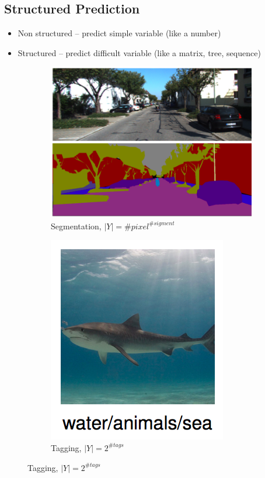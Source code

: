 \documentclass{beamer}
\begin{document}
\subsection*{Structured Prediction}
\begin{frame}
	\begin{itemize}
		\item Non structured -- predict simple variable (like a number)
		\item Structured -- predict difficult variable (like a matrix, tree, sequence)
	\end{itemize}
	
	\begin{figure}
		\begin{subfigure}{.49\textwidth}
			\centering \includegraphics[scale=0.23]{img/seg} 
			\caption{Segmentation, $|Y| = \#pixel^{\#sigment}$}
		\end{subfigure}
		\begin{subfigure}{.49\textwidth}
			\centering \includegraphics[scale=0.2]{img/taging} 
			\caption{Tagging, $|Y| = 2^{\#tags}$}
		\end{subfigure}
		

\end{figure}
\end{frame}
\end{document}
